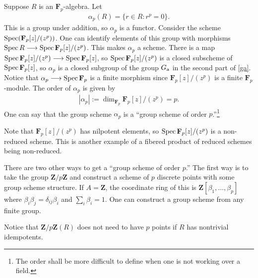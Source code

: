 \documentclass [11 pt, oneside] {article}
\begin{document}
\begin{example}[ ]\label{}\text{}
Suppose $R$ is an $\mathbf{F}_{p}$-algebra. Let 
\begin{align*}
	\alpha_p(R) = \{ r\in R : r^p =0\}.
\end{align*}
This is a group under addition, so $\alpha_p$ is a functor. Consider the scheme $\operatorname{Spec} (\mathbf{F}_{p}[z]/(z^p))$. One can identify elements of this group with morphisms $\operatorname{Spec} R \longrightarrow \operatorname{Spec} \mathbf{F}_{p}[z]/(z^p)$. This makes $\alpha_p$ a scheme. There is a map $\operatorname{Spec} \mathbf{F}_{p}[z]/(z^p)\longrightarrow \operatorname{Spec} \mathbf{F}_{p}[z]$, so $\operatorname{Spec} \mathbf{F}_{p}[z]/(z^p)$ is a closed subscheme of $\operatorname{Spec} \mathbf{F}_{p}[z]$, so $\alpha_p$ is a closed subgroup of the group $G \textsubscript{a}$ in the second part of \cref{ga}. Notice that $\alpha_p \longrightarrow \operatorname{Spec} \mathbf{F}_{p}$ is a finite morphism since $\mathbf{F}_{p}[z]/(z^p)$ is a finite $\mathbf{F}_{p}$-module. The order of $\alpha_p$ is given by
\begin{align*}
	\left\lvert \alpha_p \right\rvert := \dim_{\mathbf{F}_{p}} \mathbf{F}_{p}[z]/(z^p) =p.
\end{align*}
One can say that the group scheme $\alpha_p$ is a ``group scheme of order $p$.''\footnote{The order shall be more difficult to define when one is not working over a field.}

Note that $\mathbf{F}_{p}[z]/(z^p)$ has nilpotent elements, so $\operatorname{Spec} \mathbf{F}_{p}[z]/(z^p)$ is a non-reduced scheme. This is another example of a fibered product of reduced schemes being non-reduced.
\end{example}

There are two other ways to get a ``group scheme of order $p$.'' The first way is to take the group $\mathbf{Z}/p\mathbf{Z}$ and construct a scheme of $p$ discrete points with some group scheme structure. If $A=\mathbf{Z}$, the coordinate ring of this is $\mathbf{Z}[\beta_1,\hdots, \beta_p]$ where $\beta_{i}\beta_j =\delta_{ij}\beta_i $ and $\sum_{i}^{} \beta_i=1$. One can construct a group scheme from any finite group.

\begin{remark}
	Notice that $\mathbf{Z}/p\mathbf{Z}(R)$ does not need to have $p$ points if $R$ has nontrivial idempotents.
\end{remark}
\end{document}

